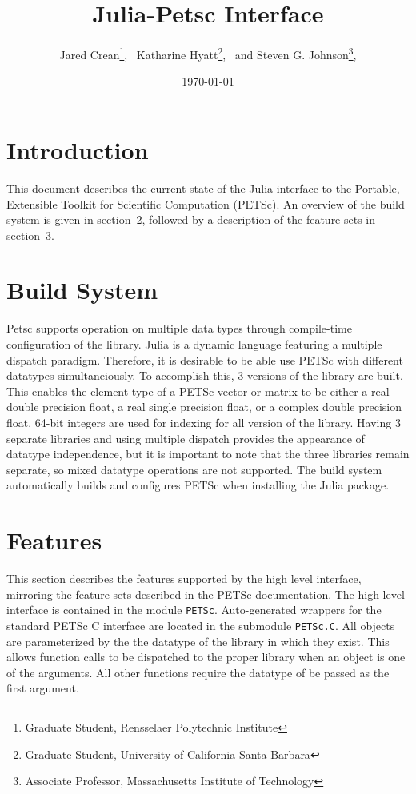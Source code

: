 \documentclass{article}
\title{Julia-Petsc Interface}
\author{
  Jared Crean\thanks{Graduate Student, Rensselaer Polytechnic Institute}, \
  Katharine Hyatt\thanks{Graduate Student, University of California Santa Barbara}, \ and
  Steven G. Johnson\thanks{Associate Professor, Massachusetts Institute of Technology},
}
\date{\today}
\newcommand{\ttt}{\texttt}
\begin{document}
\maketitle

\section{Introduction} \label{sec:intro}
This document describes the current state of the Julia interface to the Portable, Extensible Toolkit for Scientific Computation (PETSc).  An overview of the build system is given in section~\ref{sec:build}, followed by a description of the  feature sets in section~\ref{sec:features}.

\section{Build System} \label{sec:build}
Petsc supports operation on multiple data types through compile-time configuration of the library.
Julia is a dynamic language featuring a multiple dispatch paradigm.
Therefore, it is desirable to be able use PETSc with different datatypes simultaneiously. 
To accomplish this, 3 versions of the library are built.
This enables the element type of a PETSc vector or matrix to be either  a real double precision float, a real single precision float, or a complex double precision float.
64-bit integers are used for indexing for all version of the library.
Having 3 separate libraries and using multiple dispatch provides the appearance of datatype independence, but it is important to note that the three libraries remain separate, so mixed datatype operations are not supported.
The build system automatically builds and configures PETSc when installing the Julia package.


\section{Features} \label{sec:features}
This section describes the features supported by the high level interface, mirroring the feature sets described in the PETSc documentation.
The high level interface is contained in the  module \ttt{PETSc}.
Auto-generated wrappers for the standard PETSc C interface are located in the submodule \ttt{PETSc.C}.
All objects are parameterized by the the datatype of the library in which they exist.
This allows function calls to be dispatched to the proper library when an object is one of the arguments.
All other functions require the datatype of be passed as the first argument.
\end{document}
